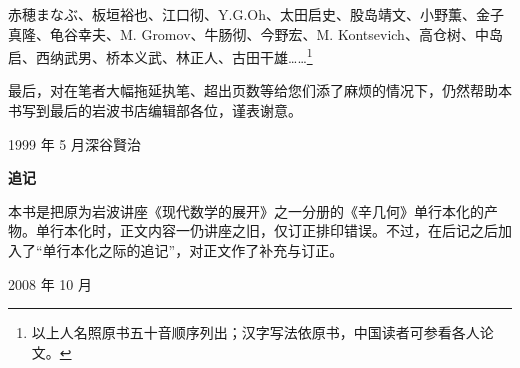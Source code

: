 赤穂まなぶ、板垣裕也、江口彻、Y.G.Oh、太田启史、股岛靖文、小野薫、金子真隆、龟谷幸夫、M. Gromov、牛肠彻、今野宏、M. Kontsevich、高仓树、中岛启、西纳武男、桥本义武、林正人、古田干雄……\footnote{以上人名照原书五十音顺序列出；汉字写法依原书，中国读者可参看各人论文。}

最后，对在笔者大幅拖延执笔、超出页数等给您们添了麻烦的情况下，仍然帮助本书写到最后的岩波书店编辑部各位，谨表谢意。

1999 年 5 月\quad 深谷賢治

\medskip
\noindent\textbf{追记}

本书是把原为岩波讲座《现代数学的展开》之一分册的《辛几何》单行本化的产物。单行本化时，正文内容一仍讲座之旧，仅订正排印错误。不过，在后记之后加入了“单行本化之际的追记”，对正文作了补充与订正。

2008 年 10 月
